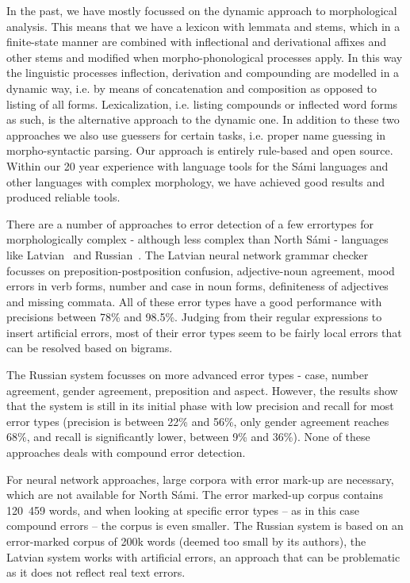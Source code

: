 \documentclass[free]{flammie}
\begin{document}
In the past, we have mostly focussed on the dynamic approach to morphological analysis. This means that we have a lexicon with lemmata and stems, which in a finite-state manner are combined with inflectional and derivational affixes and other stems and modified when morpho-phonological processes apply.
In this way the linguistic processes inflection, derivation and compounding are modelled in a dynamic way, i.e. by means of concatenation and composition as opposed to listing of all forms.
Lexicalization, i.e. listing compounds or inflected word forms as such, is the alternative approach to the dynamic one.
In addition to these two approaches we also use guessers for certain tasks, i.e. proper name guessing in morpho-syntactic parsing. %
Our approach is entirely rule-based and open source. Within our 20 year experience with language tools for the Sámi languages and other languages with complex morphology, we have achieved good results and produced reliable tools.

There are a number of approaches to error detection of a few errortypes for morphologically complex - although less complex than North Sámi - languages like Latvian~\cite{Deksne2019} and Russian~\cite{Rozovskaya2019}.
The Latvian neural network grammar checker focusses on preposition-postposition confusion, adjective-noun agreement, mood errors in verb forms, number and case in noun forms, definiteness of adjectives and missing commata. All of these error types have a good performance with precisions between 78\% and 98.5\%.
Judging from their regular expressions to insert artificial errors, most of their error types seem to be fairly local errors that can be resolved based on bigrams.

The Russian system focusses on more advanced error types - case, number agreement, gender agreement, preposition and aspect. However, the results show that the system is still in its initial phase with low precision and recall for most error types (precision is between 22\% and 56\%, only gender agreement reaches 68\%, and recall is significantly lower, between 9\% and 36\%).
None of these approaches deals with compound error detection.


For neural network approaches, large corpora with error mark-up are necessary, which are not available for North Sámi. The error marked-up corpus contains 120~459 words, and when looking at specific error types -- as in this case compound errors -- the corpus is even smaller.
The Russian system is based on an error-marked corpus of 200k words (deemed too small by its authors), the Latvian system works with artificial errors, an approach that can be problematic as it does not reflect real text errors.
\end{document}
